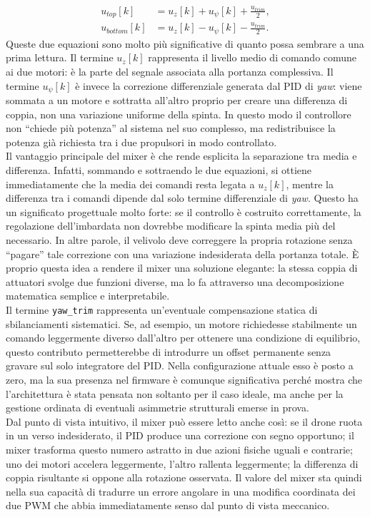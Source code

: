 \documentclass[11pt]{report}
\begin{document}
	\begin{align}
		u_{top}[k] &= u_z[k] + u_{\psi}[k] + \frac{u_{trim}}{2}, \\
		u_{bottom}[k] &= u_z[k] - u_{\psi}[k] - \frac{u_{trim}}{2}.
	\end{align}
	Queste due equazioni sono molto più significative di quanto possa sembrare a una prima lettura. Il termine $u_z[k]$ rappresenta il livello medio di comando comune ai due motori: è la parte del segnale associata alla portanza complessiva. Il termine $u_{\psi}[k]$ è invece la correzione differenziale generata dal PID di \textit{yaw}: viene sommata a un motore e sottratta all'altro proprio per creare una differenza di coppia, non una variazione uniforme della spinta. In questo modo il controllore non ``chiede più potenza'' al sistema nel suo complesso, ma redistribuisce la potenza già richiesta tra i due propulsori in modo controllato.\\
	Il vantaggio principale del mixer è che rende esplicita la separazione tra media e differenza. Infatti, sommando e sottraendo le due equazioni, si ottiene immediatamente che la media dei comandi resta legata a $u_z[k]$, mentre la differenza tra i comandi dipende dal solo termine differenziale di \textit{yaw}. Questo ha un significato progettuale molto forte: se il controllo è costruito correttamente, la regolazione dell'imbardata non dovrebbe modificare la spinta media più del necessario. In altre parole, il velivolo deve correggere la propria rotazione senza ``pagare'' tale correzione con una variazione indesiderata della portanza totale. È proprio questa idea a rendere il mixer una soluzione elegante: la stessa coppia di attuatori svolge due funzioni diverse, ma lo fa attraverso una decomposizione matematica semplice e interpretabile.\\
	Il termine \texttt{yaw\_trim} rappresenta un'eventuale compensazione statica di sbilanciamenti sistematici. Se, ad esempio, un motore richiedesse stabilmente un comando leggermente diverso dall'altro per ottenere una condizione di equilibrio, questo contributo permetterebbe di introdurre un offset permanente senza gravare sul solo integratore del PID. Nella configurazione attuale esso è posto a zero, ma la sua presenza nel firmware è comunque significativa perché mostra che l'architettura è stata pensata non soltanto per il caso ideale, ma anche per la gestione ordinata di eventuali asimmetrie strutturali emerse in prova.\\
	Dal punto di vista intuitivo, il mixer può essere letto anche così: se il drone ruota in un verso indesiderato, il PID produce una correzione con segno opportuno; il mixer trasforma questo numero astratto in due azioni fisiche uguali e contrarie; uno dei motori accelera leggermente, l'altro rallenta leggermente; la differenza di coppia risultante si oppone alla rotazione osservata. Il valore del mixer sta quindi nella sua capacità di tradurre un errore angolare in una modifica coordinata dei due PWM che abbia immediatamente senso dal punto di vista meccanico.\\
\end{document}
